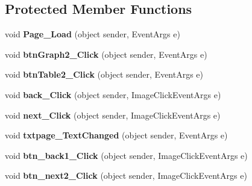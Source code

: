 \subsection*{Protected Member Functions}
\begin{DoxyCompactItemize}
\item 
\hypertarget{classusertrackothers__sleep_a41718f307cab7149634ee3a3b5dd97a0}{void {\bfseries Page\-\_\-\-Load} (object sender, Event\-Args e)}\label{classusertrackothers__sleep_a41718f307cab7149634ee3a3b5dd97a0}

\item 
\hypertarget{classusertrackothers__sleep_a3143b954c39dd09a72206efe26a6fc85}{void {\bfseries btn\-Graph2\-\_\-\-Click} (object sender, Event\-Args e)}\label{classusertrackothers__sleep_a3143b954c39dd09a72206efe26a6fc85}

\item 
\hypertarget{classusertrackothers__sleep_a97a52a0406580a42e8102933730d76f4}{void {\bfseries btn\-Table2\-\_\-\-Click} (object sender, Event\-Args e)}\label{classusertrackothers__sleep_a97a52a0406580a42e8102933730d76f4}

\item 
\hypertarget{classusertrackothers__sleep_a6846a07172ba950566e52726557dc54c}{void {\bfseries back\-\_\-\-Click} (object sender, Image\-Click\-Event\-Args e)}\label{classusertrackothers__sleep_a6846a07172ba950566e52726557dc54c}

\item 
\hypertarget{classusertrackothers__sleep_a63b9295ed9a8b311a08101a332404623}{void {\bfseries next\-\_\-\-Click} (object sender, Image\-Click\-Event\-Args e)}\label{classusertrackothers__sleep_a63b9295ed9a8b311a08101a332404623}

\item 
\hypertarget{classusertrackothers__sleep_aa06356e8bc3ce18febd28697f0252672}{void {\bfseries txtpage\-\_\-\-Text\-Changed} (object sender, Event\-Args e)}\label{classusertrackothers__sleep_aa06356e8bc3ce18febd28697f0252672}

\item 
\hypertarget{classusertrackothers__sleep_a49de471c7d3a8e115d7ae799a56f29a3}{void {\bfseries btn\-\_\-back1\-\_\-\-Click} (object sender, Image\-Click\-Event\-Args e)}\label{classusertrackothers__sleep_a49de471c7d3a8e115d7ae799a56f29a3}

\item 
\hypertarget{classusertrackothers__sleep_a112cd204d0a214ddfd2d1e3c09a1444d}{void {\bfseries btn\-\_\-next2\-\_\-\-Click} (object sender, Image\-Click\-Event\-Args e)}\label{classusertrackothers__sleep_a112cd204d0a214ddfd2d1e3c09a1444d}


\end{DoxyCompactItemize}
